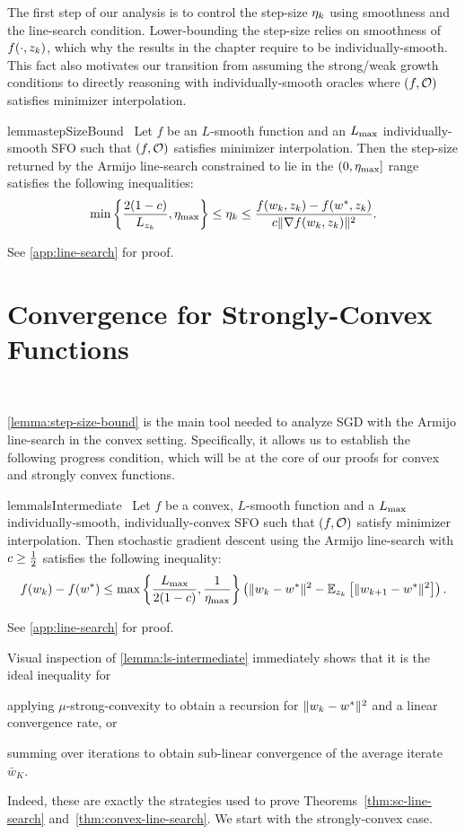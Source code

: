 The first step of our analysis is to control the step-size \( \etak \) using smoothness and the line-search condition.
Lower-bounding the step-size relies on smoothness of \( f(\cdot, \zk) \), which why the results in the chapter require \oracle{} to be individually-smooth. 
This fact also motivates our transition from assuming the strong/weak growth conditions to directly reasoning with individually-smooth oracles where \( \rbr{f, \oracle{}} \) satisfies minimizer interpolation.
\begin{restatable}{lemma}{stepSizeBound}~\label{lemma:step-size-bound}
    Let \( f \) be an \( L \)-smooth function and \oracle{} an \( \Lmax \) individually-smooth \ac{SFO} such that \( \rbr{f, \oracle{}} \) satisfies minimizer interpolation. 
    Then the step-size returned by the Armijo line-search constrained to lie in the \( (0, \etamax] \) range satisfies the following inequalities:
    \[ \min\cbr{\frac{2 (1-c)}{\Lk}, \etamax} \leq \etak \leq \frac{f(\wk, \zk) - f(\wopt, \zk)}{c \norm{\grad(\wk, \zk)}^2}. \]
\end{restatable}
\noindent See \autoref{app:line-search} for proof.

\section{Convergence for Strongly-Convex Functions}~\label{sec:ls-sc}

\autoref{lemma:step-size-bound} is the main tool needed to analyze \ac{SGD} with the Armijo line-search in the convex setting.
Specifically, it allows us to establish the following progress condition, which will be at the core of our proofs for convex and strongly convex functions. 
\begin{restatable}{lemma}{lsIntermediate}~\label{lemma:ls-intermediate}
    Let \( f \) be a convex, \( L \)-smooth function and \oracle{} a \( \Lmax \) individually-smooth, individually-convex \ac{SFO} such that \( \rbr{f, \oracle{}} \) satisfy minimizer interpolation.
    Then stochastic gradient descent using the Armijo line-search with \( c \geq \half \) satisfies the following
    inequality:
    \[ f(\wk)- f(\wopt) \leq \max\cbr{\frac{\Lmax}{2(1-c)},\inv{\etamax}} \rbr{\norm{\wk - \wopt}^2 - \E_{\zk}\sbr{\norm{\wkk - \wopt}^2}}. \]
\end{restatable}
\noindent See \autoref{app:line-search} for proof. \hfill \break

Visual inspection of \autoref{lemma:ls-intermediate} immediately shows that it is the ideal inequality for 
\begin{inparaenum}[(a)]
    \item applying \( \mu \)-strong-convexity to obtain a recursion for \( \norm{\wk - \wopt}^2 \) and  a linear convergence rate, or
    \item summing over iterations to obtain sub-linear convergence of the average iterate \( \bar w_K \).
\end{inparaenum}
Indeed, these are exactly the strategies used to prove Theorems~\ref{thm:sc-line-search} and~\ref{thm:convex-line-search}.
We start with the strongly-convex case.

